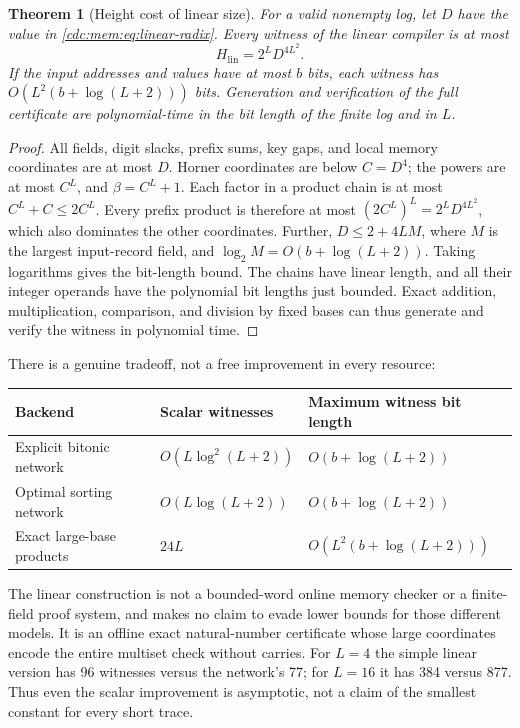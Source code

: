 \documentclass[11pt,a4paper]{article}
\newtheorem{theorem}{Theorem}[section]
\theoremstyle{definition}
\theoremstyle{remark}
\begin{document}
\begin{theorem}[Height cost of linear size]\label{cdc:mem:thm:linear-height}
For a valid nonempty log, let $D$ have the value in
\eqref{cdc:mem:eq:linear-radix}. Every witness of the linear compiler is at most
\begin{equation}\label{cdc:mem:eq:linear-height}
 H_{\mathrm{lin}}=2^L D^{4L^2}.
\end{equation}
If the input addresses and values have at most $b$ bits, each witness has
$O(L^2(b+\log(L+2)))$ bits. Generation and verification of the full certificate
are polynomial-time in the bit length of the finite log and in $L$.
\end{theorem}
\begin{proof}
All fields, digit slacks, prefix sums, key gaps, and local memory coordinates
are at most $D$. Horner coordinates are below $C=D^4$; the powers are at most
$C^L$, and $\beta=C^L+1$. Each factor in a product chain is at most
$C^L+C\leq2C^L$. Every prefix product is therefore at most
$(2C^L)^L=2^LD^{4L^2}$, which also dominates the other coordinates. Further,
$D\leq2+4LM$, where $M$ is the largest input-record field, and
$\log_2 M=O(b+\log(L+2))$. Taking logarithms gives the bit-length bound.
The chains have linear length, and all their integer operands have the
polynomial bit lengths just bounded. Exact addition, multiplication, comparison,
and division by fixed bases can thus generate and verify the witness in
polynomial time.
\end{proof}

There is a genuine tradeoff, not a free improvement in every resource:
\begin{center}
\begin{tabularx}{\textwidth}{@{}p{}p{}X@{}}
\toprule
Backend & Scalar witnesses & Maximum witness bit length\\
\midrule
Explicit bitonic network & $O(L\log^2(L+2))$ & $O(b+\log(L+2))$\\
Optimal sorting network & $O(L\log(L+2))$ & $O(b+\log(L+2))$\\
Exact large-base products & $24L$ & $O(L^2(b+\log(L+2)))$\\
\bottomrule
\end{tabularx}
\end{center}
The linear construction is not a bounded-word online memory checker or a
finite-field proof system, and makes no claim to evade lower bounds for those
different models. It is an offline exact natural-number certificate whose
large coordinates encode the entire multiset check without carries.
For $L=4$ the simple linear version has 96 witnesses versus the network's 77;
for $L=16$ it has 384 versus 877. Thus even the scalar improvement is asymptotic,
not a claim of the smallest constant for every short trace.
\end{document}
